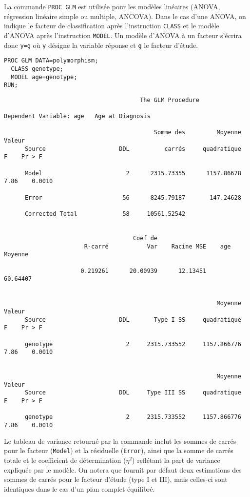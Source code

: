 La commande \texttt{PROC GLM} est utilisée pour les modèles linéaires
(ANOVA, régression linéaire simple ou multiple, ANCOVA). Dans le cas d'une
ANOVA, on indique le facteur de classification après l'instruction
\texttt{CLASS} et le modèle d'ANOVA après l'instruction \texttt{MODEL}. Un
modèle d'ANOVA à un facteur s'écrira donc \texttt{y=g} où \texttt{y} désigne
la variable réponse et \texttt{g} le facteur d'étude. 
\begin{verbatim}
PROC GLM DATA=polymorphism; 
  CLASS genotype; 
  MODEL age=genotype; 
RUN;
\end{verbatim}

\begin{verbatim}
                                       The GLM Procedure

Dependent Variable: age   Age at Diagnosis

                                           Somme des         Moyenne     Valeur
      Source                     DDL          carrés     quadratique          F    Pr > F

      Model                        2      2315.73355      1157.86678       7.86    0.0010

      Error                       56      8245.79187       147.24628

      Corrected Total             58     10561.52542


                                     Coef de
                       R-carré           Var    Racine MSE    age Moyenne

                      0.219261      20.00939      12.13451       60.64407


                                                             Moyenne     Valeur
      Source                     DDL       Type I SS     quadratique          F    Pr > F

      genotype                     2     2315.733552     1157.866776       7.86    0.0010


                                                             Moyenne     Valeur
      Source                     DDL     Type III SS     quadratique          F    Pr > F

      genotype                     2     2315.733552     1157.866776       7.86    0.0010
\end{verbatim}

Le tableau de variance retourné par la commande inclut les sommes de carrés
pour le facteur (\texttt{Model}) et la résiduelle (\texttt{Error}), ainsi
que la somme de carrés totale et le coefficient de détermination ($\eta^2$)
reflétant la part de variance expliquée par le modèle. On notera que \SAS
fournit par défaut deux estimations des sommes de carrés pour le facteur
d'étude (type I et III), mais celles-ci sont identiques dans le cas d'un
plan complet équilibré.

